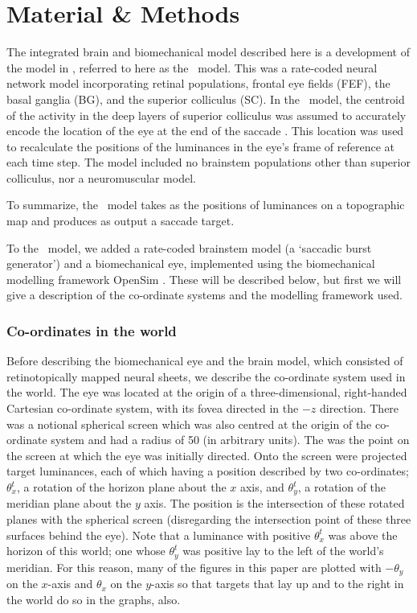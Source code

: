 \documentclass{frontiersSCNS}
\begin{document}
\section{Material \& Methods}

The integrated brain and biomechanical model described here is a
development of the model in \cite{cope_basal_2017},
referred to here as the \ccg~model. This was a rate-coded neural
network model incorporating retinal populations, frontal eye fields
(FEF), the basal ganglia (BG), and the superior colliculus (SC). In
the \ccg~model, the centroid of the activity in the deep
layers of superior colliculus was assumed to accurately encode the
location of the eye at the end of the
saccade \citep{wurtz_activity_1972,robinson_eye_1972,van_gisbergen_collicular_1987,mcilwain_lateral_1982}.
This location was used to recalculate the positions of the luminances in
the eye's frame of reference at each time step. The model included no
brainstem populations other than superior colliculus, nor a
neuromuscular model.

To summarize, the \ccg~model takes as  the positions
of luminances on a topographic map and produces as output a saccade
target.

To the \ccg~model, we added a rate-coded brainstem model (a `saccadic
burst generator') and a biomechanical eye, implemented using the
biomechanical modelling framework OpenSim \citep{seth_opensim_2015}.
These will be described below, but first we will give a description of
the co-ordinate systems and the modelling framework used.

\subsubsection{Co-ordinates in the world}

Before describing the biomechanical eye and the brain model, which consisted
of retinotopically mapped neural sheets, we describe the co-ordinate system
used in the world. The eye was located at the origin of a three-dimensional, right-handed
Cartesian co-ordinate system, with its fovea directed in the $-z$ direction.
There was a notional spherical screen which was also centred at the origin of the
co-ordinate system and had a radius of 50 (in arbitrary units). The  was the point on the
screen at which the eye was initially directed.
Onto the screen were projected target luminances, each of which having a position
described by two co-ordinates; $\theta_{x}^{t}$, a
rotation of the horizon plane about the $x$ axis, and $\theta_{y}^{t}$, a rotation
of the meridian plane about the $y$ axis. The position is the intersection
of these rotated planes with the spherical screen (disregarding
the intersection point of these three surfaces behind the eye).
%
Note that a luminance with positive $\theta_{x}^{t}$ was above the horizon of this world;
one whose $\theta_{y}^{t}$ was positive lay to the left of the world's meridian. For this
reason, many of the figures in this paper are plotted with $-\theta_{y}$ on the
$x$-axis and $\theta_{x}$ on the $y$-axis so that targets that lay up and to the right
in the world do so in the graphs, also.
\end{document}
